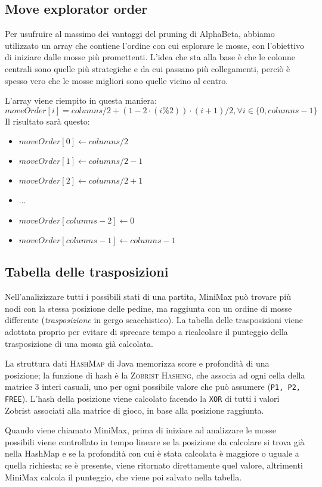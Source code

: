 \documentclass{article}
\begin{document}
\subsection{Move explorator order}
Per usufruire al massimo dei vantaggi del pruning di AlphaBeta, abbiamo utilizzato un array che contiene
l'ordine con cui esplorare le mosse, con l'obiettivo di iniziare dalle mosse più promettenti.
L'idea che sta alla base è che le colonne centrali sono quelle più strategiche e da cui passano
più collegamenti, perciò è spesso vero che le mosse migliori sono quelle vicino al centro.

L'array viene riempito in questa maniera:
$$moveOrder[i] = columns / 2 + (1 - 2 \cdot (i \% 2)) \cdot (i + 1) / 2, \forall i \in \{0,columns-1\} $$
Il risultato sarà questo: 
\begin{itemize}
  \item $moveOrder[0] \gets columns/2$
  \item $moveOrder[1] \gets columns/2 -1$
  \item $moveOrder[2] \gets columns/2 +1$
  \item ...
  \item $moveOrder[columns-2] \gets 0$
  \item $moveOrder[columns-1] \gets columns-1$
\end{itemize}

\subsection{Tabella delle trasposizioni}

Nell'analizizzare tutti i possibili stati di una partita, MiniMax può trovare più nodi con la stessa
posizione delle pedine, ma raggiunta con un ordine di mosse differente (\emph{trasposizione} 
in gergo scacchistico). La tabella delle trasposizioni viene adottata proprio per evitare di sprecare 
tempo a ricalcolare il punteggio della trasposizione di una mossa già calcolata.

La struttura dati \textsc{HashMap} di Java memorizza score e profondità di una posizione; la funzione di 
hash è la \textsc{Zobrist Hashing}, che associa ad ogni cella della matrice 3 interi casuali, uno per 
ogni possibile valore che può assumere (\verb!P1, P2, FREE!). L'hash della posizione viene calcolato 
facendo la \verb!XOR! di tutti i valori Zobrist associati alla matrice di gioco, in base alla 
posizione raggiunta.

Quando viene chiamato MiniMax, prima di iniziare ad analizzare le mosse possibili viene controllato
in tempo lineare se la posizione da calcolare si trova già nella HashMap e se la profondità con cui è
stata calcolata è maggiore o uguale a quella richiesta; se è presente, viene ritornato direttamente
quel valore, altrimenti MiniMax calcola il punteggio, che viene poi salvato nella tabella.
\end{document}
